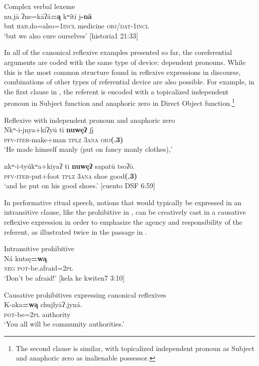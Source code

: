 \documentclass[output=paper]{../langscibook}
\begin{document}
\ex\label{ex:campbell:25b}
{  Complex verbal lexeme}\\
\gll nu.jā  ʔne=kāʔá\textbf{=ą}  kʷítī  j\textbf{{}-nā}\\
     but  \textsc{hab.}do=also=1\textsc{incl}  medicine  \textsc{obj/dat-1incl}\\
\glt ‘but we also cure ourselves’ [historia1 21:33]
\z
\z

In all of the canonical reflexive examples presented so far, the coreferential arguments are coded with the same type of device: dependent pronouns. While this is the most common structure found in reflexive expressions in discourse, combinations of other types of referential device are also possible. For example, in the first clause in , the referent is encoded with a topicalized independent pronoun in Subject function and anaphoric zero in Direct Object function.\footnote{The second clause is similar, with topicalized independent pronoun as Subject and anaphoric zero as inalienable possessor.}


\ea\label{ex:campbell:26}
{Reflexive with independent pronoun and anaphoric zero}\\
\gll Nkʷ-i-jnya+kíʔyū  tī  \textbf{nuwęʔ}  jį̄  \\
     \textsc{pfv-iter-}make+man  \textsc{tplz}  \textsc{3ana}  \textsc{obj}\textbf{\textsc{(.3)}}\\
\glt ‘He made himself manly (put on fancy manly clothes),’

\gll nkʷ-i-tyúkʷa+kiyaʔ  tī  \textbf{nuwęʔ}  sapatū  tsoʔō.\\
     \textsc{pfv-iter-}put+foot  \textsc{tplz}  \textsc{3ana}  shoe  good\textbf{(.3)} \\
\glt ‘and he put on his good shoes.’ [cuento DSF 6:59]
\z


In performative ritual speech, notions that would typically be expressed in an intransitive clause, like the prohibitive in , can be creatively cast in a causative reflexive expression in order to emphasize the agency and responsibility of the referent, as illustrated twice in the passage in .


\ea\label{ex:campbell:27}
{Intransitive prohibitive}\\
\gll Ná  kutsę\textbf{=wą}.\\
     \textsc{neg}  \textsc{pot-}be.afraid=\textsc{2pl}\\
\glt ‘Don’t be afraid!’ [kela ke kwiten7 3:10]
\z

\ea\label{ex:campbell:28}
{Causative prohibitives expressing canonical reflexives}\\
\ea
\gll K-aka\textbf{=wą}  chujlyāʔ.jyná.\\
     \textsc{pot-}be=\textsc{2pl}  authority\\
\glt ‘You all will be community authorities.’
\end{document}
